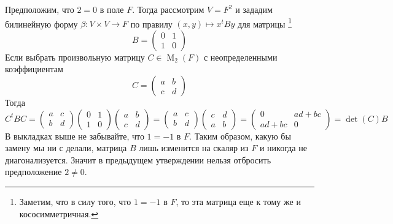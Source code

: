 Предположим, что $2 = 0$ в поле $F$.
Тогда рассмотрим $V = F^2$ и зададим билинейную форму $\beta\colon V\times V\to F$ по правилу $(x,y)\mapsto x^t By$ для матрицы%
\footnote{Заметим, что в силу того, что $1 = -1$ в $F$, то эта матрица еще к тому же и кососимметричная.}
\[
B = 
\begin{pmatrix}
{0}&{1}\\
{1}&{0}
\end{pmatrix}
\]
Если выбрать произвольную матрицу $C \in \operatorname{M}_2(F)$ с неопределенными коэффициентам
\[
C = 
\begin{pmatrix}
{a}&{b}\\
{c}&{d}
\end{pmatrix}
\]
Тогда
\[
C^t B C = 
\begin{pmatrix}
{a}&{c}\\
{b}&{d}
\end{pmatrix}
\begin{pmatrix}
{0}&{1}\\
{1}&{0}
\end{pmatrix}
\begin{pmatrix}
{a}&{b}\\
{c}&{d}
\end{pmatrix}
=
\begin{pmatrix}
{a}&{c}\\
{b}&{d}
\end{pmatrix}
\begin{pmatrix}
{c}&{d}\\
{a}&{b}
\end{pmatrix}
=
\begin{pmatrix}
{0}&{ad + bc}\\
{ad +  bc}&{0}
\end{pmatrix}
=
\det(C)B
\]
В выкладках выше не забывайте, что $1 = -1$ в $F$.
Таким образом, какую бы замену мы ни с делали, матрица $B$ лишь изменится на скаляр из $F$ и никогда не диагонализуется.
Значит в предыдущем утверждении нельзя отбросить предположение $2 \neq 0$.

